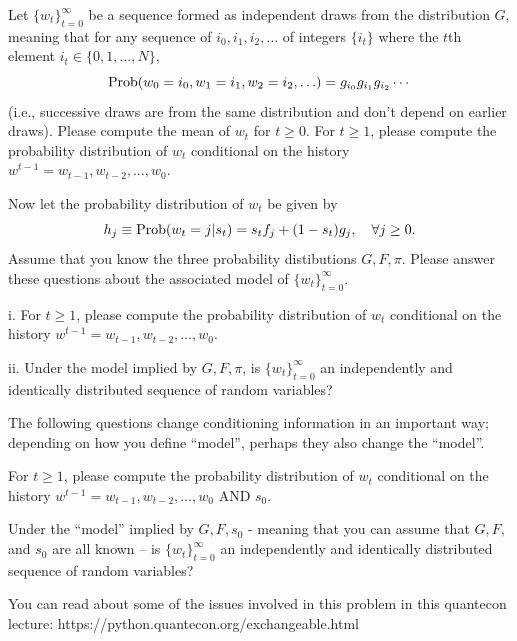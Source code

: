 \medskip
{}  Let  $\{w_t\}_{t=0}^\infty$ be a sequence formed as independent draws from the distribution $G$, meaning that
for any sequence of $i_0, i_1, i_2, \ldots $ of integers $\{i_t\}$ where the $t$th element $i_t  \in \{0, 1, \ldots, N\}$,
 $${\rm Prob}(w_0 = i_0, w_1 = i_1, w_2 = i_2, \ldots)  = g_{i_0} g_{i_1} g_{i_2}  \cdots $$
(i.e., successive draws are from the same distribution and don't depend on earlier draws). Please compute the mean of $w_t$ for $t \geq 0$.
For $t \geq 1$,
please compute the probability distribution of  $w_t$ conditional on the history $w^{t-1} = w_{t-1}, w_{t-2}, \ldots, w_0$.

\medskip
{} Now let  the probability distribution of $w_t$  be given by
$$ h_j \equiv {\rm Prob}(w_t = j | s_t)  = s_t f_j + (1-s_t) g_j ,  \quad \forall j \geq 0. $$
Assume that you know the three probability distibutions $G, F, \pi$.
Please answer these questions about the associated   model of  $\{w_t\}_{t=0}^\infty$.


\smallskip
\item{i.}  For $t \geq 1$,
please compute the probability distribution of  $w_t$ conditional on the history $w^{t-1} = w_{t-1}, w_{t-2}, \ldots, w_0$.


\item{ii.} Under the model implied by $G, F, \pi$, is $\{w_t\}_{t=0}^\infty$ an independently and identically distributed sequence of random variables?

\medskip


\noindent The following questions change conditioning information in an important way; depending on how you define ``model'', perhaps they also change the ``model''.


\medskip
{} For $t \geq 1$,
please compute the probability distribution of  $w_t$ conditional on  the history $w^{t-1} = w_{t-1}, w_{t-2}, \ldots, w_0$ AND $s_0$.

\medskip
{} Under the ``model'' implied by $G, F, s_0$  - meaning that you can assume that $G, F,$ and $s_0$ are all known --  is $\{w_t\}_{t=0}^\infty$ an independently and identically distributed sequence of random variables?

\medskip
{}  You can read about some of the issues involved in this problem in this quantecon lecture:
https://python.quantecon.org/exchangeable.html



\medskip
{} 

